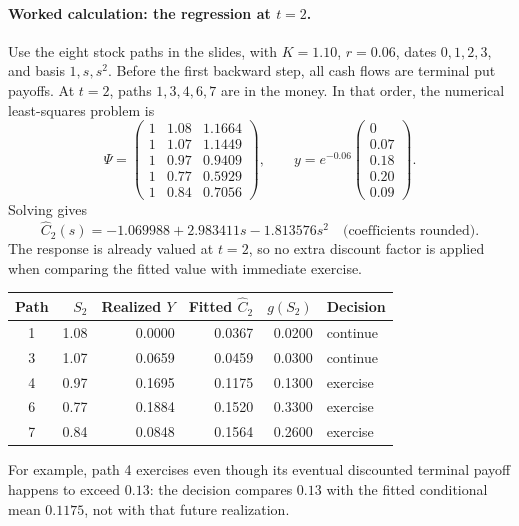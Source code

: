 \documentclass[10pt]{article}
\newcommand{\1}{\mathbf 1}
\theoremstyle{definition}
\begin{document}
\paragraph{Worked calculation: the regression at \(t=2\).}
Use the eight stock paths in the slides, with \(K=1.10\), \(r=0.06\),
dates \(0,1,2,3\), and basis \(1,s,s^2\). Before the first backward step,
all cash flows are terminal put payoffs. At \(t=2\), paths \(1,3,4,6,7\)
are in the money. In that order, the numerical least-squares problem is
\[
\Psi=\begin{pmatrix}
1&1.08&1.1664\\
1&1.07&1.1449\\
1&0.97&0.9409\\
1&0.77&0.5929\\
1&0.84&0.7056
\end{pmatrix},\qquad
y=e^{-0.06}\begin{pmatrix}0\\0.07\\0.18\\0.20\\0.09\end{pmatrix}.
\]
Solving gives
\[
\widehat C_2(s)=-1.069988+2.983411s-1.813576s^2
\quad\text{(coefficients rounded)}.
\]
The response is already valued at \(t=2\), so no extra discount factor is
applied when comparing the fitted value with immediate exercise.
\begin{center}
\begin{tabular}{c|rrrrl}
\toprule
Path & \(S_2\) & Realized \(Y\) & Fitted \(\widehat C_2\) & \(g(S_2)\) & Decision\\
\midrule
1 & 1.08 & 0.0000 & 0.0367 & 0.0200 & continue\\
3 & 1.07 & 0.0659 & 0.0459 & 0.0300 & continue\\
4 & 0.97 & 0.1695 & 0.1175 & 0.1300 & exercise\\
6 & 0.77 & 0.1884 & 0.1520 & 0.3300 & exercise\\
7 & 0.84 & 0.0848 & 0.1564 & 0.2600 & exercise\\
\bottomrule
\end{tabular}
\end{center}
For example, path 4 exercises even though its eventual discounted terminal
payoff happens to exceed \(0.13\): the decision compares \(0.13\) with
the fitted conditional mean \(0.1175\), not with that future realization.
\end{document}
